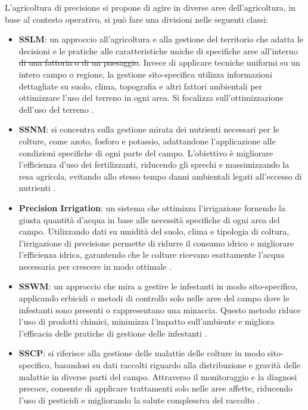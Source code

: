 \documentclass[12pt,a4paper,openright,twoside, openany]{book} %
\providecommand{\DIFadd}[1]{{\protect\color{blue}\uwave{#1}}} %
\providecommand{\DIFdel}[1]{{\protect\color{red}\sout{#1}}}                      %
\providecommand{\DIFaddbegin}{} %
\providecommand{\DIFaddend}{} %
\providecommand{\DIFdelbegin}{} %
\providecommand{\DIFdelend}{} %
\begin{document}
L'agricoltura di precisione si propone di agire in diverse aree dell'agricoltura, in base al contesto operativo, si può fare una divisioni nelle seguenti classi:
\begin{itemize}[noitemsep]
    \item \textbf{\ac{SSLM}}: un approccio all'agricoltura e alla gestione del territorio che adatta le decisioni e le pratiche alle caratteristiche uniche di specifiche aree all'interno \DIFdelbegin \DIFdel{di una fattoria o di un paesaggio}\DIFdelend \DIFaddbegin \DIFadd{dei campi}\DIFaddend . Invece di applicare tecniche uniformi su un intero campo o regione, la gestione sito-specifica utilizza informazioni dettagliate su suolo, clima, topografia e altri fattori ambientali per ottimizzare l'uso del terreno in ogni area. Si focalizza sull'ottimizzazione dell'uso del terreno \cite{SSLM}.
    \DIFaddbegin \newpage
    \DIFaddend \item \textbf{\ac{SSNM}}: si concentra sulla gestione mirata dei nutrienti necessari per le colture, come azoto, fosforo e potassio, adattandone l'applicazione alle condizioni specifiche di ogni parte del campo. L'obiettivo è migliorare l'efficienza d'uso dei fertilizzanti, riducendo gli sprechi e massimizzando la resa agricola, evitando allo stesso tempo danni ambientali legati all'eccesso di nutrienti \cite{SSNM}.
    \item \textbf{Precision Irrigation}: un sistema che ottimizza l'irrigazione fornendo la giusta quantità d'acqua in base alle necessità specifiche di ogni area del campo. Utilizzando dati su umidità del suolo, clima e tipologia di coltura, l'irrigazione di precisione permette di ridurre il consumo idrico e migliorare l'efficienza idrica, garantendo che le colture ricevano esattamente l'acqua necessaria per crescere in modo ottimale \cite{ANJUM202385}.
    \item \textbf{\ac{SSWM}}: un approccio che mira a gestire le infestanti in modo sito-specifico, applicando erbicidi o metodi di controllo solo nelle aree del campo dove le infestanti sono presenti o rappresentano una minaccia. Questo metodo riduce l'uso di prodotti chimici, minimizza l'impatto sull'ambiente e migliora l'efficacia delle pratiche di gestione delle infestanti \cite{SSWM}.
    \item \textbf{\ac{SSCP}}: si riferisce alla gestione delle malattie delle colture in modo sito-specifico, basandosi su dati raccolti riguardo alla distribuzione e gravità delle malattie in diverse parti del campo. Attraverso il monitoraggio e la diagnosi precoce, consente di applicare trattamenti solo nelle aree affette, riducendo l'uso di pesticidi e migliorando la salute complessiva del raccolto \cite{SSCP}.
\end{itemize}
\DIFdelbegin %
\end{document}
